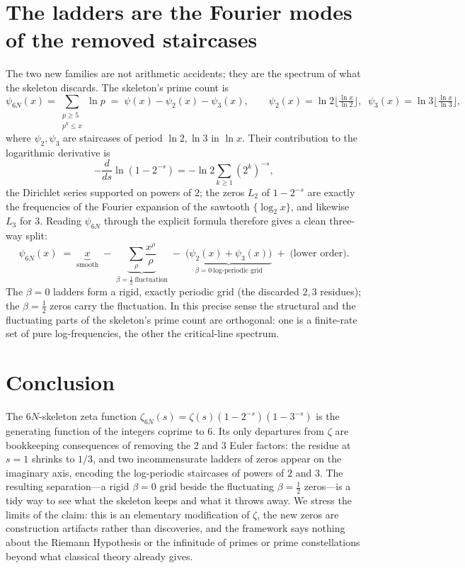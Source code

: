 \documentclass[11pt,a4paper]{article}
\begin{document}
\section{The ladders are the Fourier modes of the removed staircases}
The two new families are not arithmetic accidents; they are the spectrum of what the
skeleton discards. The skeleton's prime count is
\begin{equation}
  \psi_{6N}(x)=\!\!\sum_{\substack{p\ge5\\ p^k\le x}}\!\!\ln p
  \;=\;\psi(x)-\psi_2(x)-\psi_3(x),\qquad
  \psi_2(x)=\ln2\Big\lfloor\tfrac{\ln x}{\ln2}\Big\rfloor,\;\;
  \psi_3(x)=\ln3\Big\lfloor\tfrac{\ln x}{\ln3}\Big\rfloor,
\end{equation}
where $\psi_2,\psi_3$ are staircases of period $\ln2,\ln3$ in $\ln x$. Their
contribution to the logarithmic derivative is
\begin{equation}
  -\frac{d}{ds}\ln(1-2^{-s})
  =-\ln2\sum_{k\ge1}(2^{k})^{-s},
\end{equation}
the Dirichlet series supported on powers of $2$; the zeros $L_2$ of $1-2^{-s}$ are
exactly the frequencies of the Fourier expansion of the sawtooth $\{\log_2 x\}$, and
likewise $L_3$ for $3$. Reading $\psi_{6N}$ through the explicit formula therefore
gives a clean three-way split:
\begin{equation}
  \psi_{6N}(x)\;=\;\underbrace{x}_{\text{smooth}}
  \;-\;\underbrace{\sum_{\rho}\frac{x^{\rho}}{\rho}}_{\beta=\frac12\ \text{fluctuation}}
  \;-\;\underbrace{\big(\psi_2(x)+\psi_3(x)\big)}_{\beta=0\ \text{log-periodic grid}}
  \;+\;\text{(lower order)}.
\end{equation}
The $\beta=0$ ladders form a rigid, exactly periodic grid (the discarded $2,3$
residues); the $\beta=\tfrac12$ zeros carry the fluctuation. In this precise sense
the structural and the fluctuating parts of the skeleton's prime count are
orthogonal: one is a finite-rate set of pure log-frequencies, the other the
critical-line spectrum.

\section{Conclusion}
The $6N$-skeleton zeta function $\zeta_{6N}(s)=\zeta(s)(1-2^{-s})(1-3^{-s})$ is the
generating function of the integers coprime to $6$. Its only departures from $\zeta$
are bookkeeping consequences of removing the $2$ and $3$ Euler factors: the residue
at $s=1$ shrinks to $1/3$, and two incommensurate ladders of zeros appear on the
imaginary axis, encoding the log-periodic staircases of powers of $2$ and $3$. The
resulting separation---a rigid $\beta=0$ grid beside the fluctuating $\beta=\tfrac12$
zeros---is a tidy way to see what the skeleton keeps and what it throws away. We
stress the limits of the claim: this is an elementary modification of $\zeta$, the
new zeros are construction artifacts rather than discoveries, and the framework says
nothing about the Riemann Hypothesis or the infinitude of primes or prime
constellations beyond what classical theory already gives.
\end{document}

